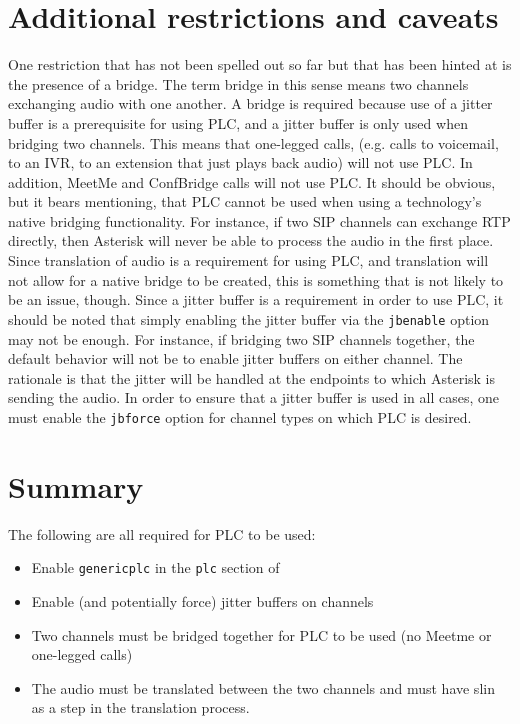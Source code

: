 \section{Additional restrictions and caveats}

	One restriction that has not been spelled out so far but that has been
hinted at is the presence of a bridge. The term bridge in this sense means
two channels exchanging audio with one another. A bridge is required because
use of a jitter buffer is a prerequisite for using PLC, and a jitter buffer
is only used when bridging two channels. This means that one-legged calls,
(e.g. calls to voicemail, to an IVR, to an extension that just plays back
audio) will not use PLC. In addition, MeetMe and ConfBridge calls will not
use PLC.
	It should be obvious, but it bears mentioning, that PLC cannot be used
when using a technology's native bridging functionality. For instance, if
two SIP channels can exchange RTP directly, then Asterisk will never be
able to process the audio in the first place. Since translation of audio
is a requirement for using PLC, and translation will not allow for a
native bridge to be created, this is something that is not likely to be
an issue, though.
	Since a jitter buffer is a requirement in order to use PLC, it should
be noted that simply enabling the jitter buffer via the \texttt{jbenable} option
may not be enough. For instance, if bridging two SIP channels together,
the default behavior will not be to enable jitter buffers on either channel.
The rationale is that the jitter will be handled at the endpoints to which
Asterisk is sending the audio. In order to ensure that a jitter buffer is
used in all cases, one must enable the \texttt{jbforce} option for channel types
on which PLC is desired.

\section{Summary}
	The following are all required for PLC to be used:
\begin{itemize}
\item Enable \texttt{genericplc} in the \texttt{plc} section of 
\item Enable (and potentially force) jitter buffers on channels
\item Two channels must be bridged together for PLC to be used
(no Meetme or one-legged calls)
\item The audio must be translated between the two channels
and must have slin as a step in the translation process.
\end{itemize}

